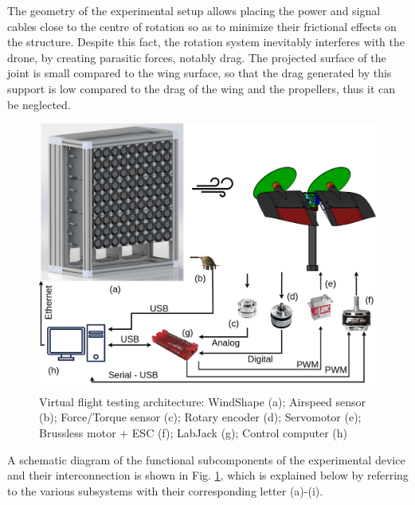 The geometry of the experimental setup allows placing the power and signal cables close to the centre of rotation so as to minimize their frictional effects on the structure. Despite this fact, the rotation system inevitably interferes with the drone, by creating parasitic forces, notably drag. The projected surface of the joint is small compared to the wing surface, so that the drag generated by this support is low compared to the drag of the wing and the propellers, thus it can be neglected.
\begin{figure}[!ht]
    \includegraphics[width=\columnwidth]{figures/maquette-min.png}
    \caption{Virtual flight testing architecture: WindShape (a); Airspeed sensor (b); Force/Torque sensor (c); Rotary encoder (d); Servomotor (e); Brussless motor + ESC (f); LabJack (g); Control computer (h)}
    \label{fig:archi}
\end{figure}

A schematic diagram of the functional subcomponents of the experimental device and their interconnection is shown in Fig. \ref{fig:archi}, which is explained below by referring to the various subsystems with their corresponding letter (a)-(i).

